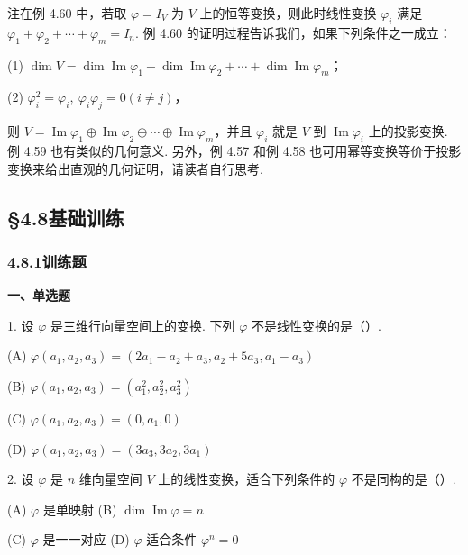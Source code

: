 \documentclass[UTF8, 12pt, fontset=fandol, oneside]{ctexart}
\begin{document}
注\quad 在例 4.60 中，若取 $\varphi=I_V$ 为 $V$ 上的恒等变换，则此时线性变换 $\varphi_i$ 满足 $\varphi_1+\varphi_2+\cdots+\varphi_m=I_n$. 例 4.60 的证明过程告诉我们，如果下列条件之一成立：

(1) $\dim V=\dim\operatorname{Im}\varphi_1+\dim\operatorname{Im}\varphi_2+\cdots+\dim\operatorname{Im}\varphi_m$；

(2) $\varphi_i^2=\varphi_i,\ \varphi_i\varphi_j=0(i\ne j)$，

则 $V=\operatorname{Im}\varphi_1\oplus\operatorname{Im}\varphi_2\oplus\cdots\oplus\operatorname{Im}\varphi_m$，并且 $\varphi_i$ 就是 $V$ 到 $\operatorname{Im}\varphi_i$ 上的投影变换. 例 4.59 也有类似的几何意义. 另外，例 4.57 和例 4.58 也可用幂等变换等价于投影变换来给出直观的几何证明，请读者自行思考.

\subsection*{§4.8\quad 基础训练}

\subsubsection*{4.8.1\quad 训练题}

\noindent\textbf{一、单选题}

1. 设 $\varphi$ 是三维行向量空间上的变换. 下列 $\varphi$ 不是线性变换的是（\quad）.

(A) $\varphi(a_1,a_2,a_3)=(2a_1-a_2+a_3,a_2+5a_3,a_1-a_3)$

(B) $\varphi(a_1,a_2,a_3)=(a_1^2,a_2^2,a_3^2)$

(C) $\varphi(a_1,a_2,a_3)=(0,a_1,0)$

(D) $\varphi(a_1,a_2,a_3)=(3a_3,3a_2,3a_1)$

2. 设 $\varphi$ 是 $n$ 维向量空间 $V$ 上的线性变换，适合下列条件的 $\varphi$ 不是同构的是（\quad）.

(A) $\varphi$ 是单映射 \hfill (B) $\dim\operatorname{Im}\varphi=n$

(C) $\varphi$ 是一一对应 \hfill (D) $\varphi$ 适合条件 $\varphi^n=0$
\end{document}
